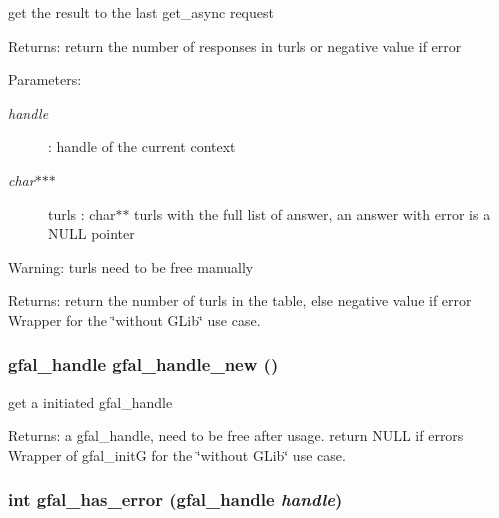get the result to the last get\_\-async request \begin{Desc}
\item[Returns:]return the number of responses in turls or negative value if error \end{Desc}
\begin{Desc}
\item[Parameters:]
\begin{description}
\item[{\em handle}]: handle of the current context \item[{\em char$\ast$$\ast$$\ast$}]turls : char$\ast$$\ast$ turls with the full list of answer, an answer with error is a NULL pointer \end{description}
\end{Desc}
\begin{Desc}
\item[Warning:]turls need to be free manually \end{Desc}
\begin{Desc}
\item[Returns:]return the number of turls in the table, else negative value if error Wrapper for the \char`\"{}without GLib\char`\"{} use case. \end{Desc}
\subsubsection{\setlength{\rightskip}{0pt plus 5cm}gfal\_\-handle gfal\_\-handle\_\-new ()}\label{gfal__common__interface_8c_4211faf02a3c5cc696c7c9f974415d11}


get a initiated gfal\_\-handle 

\begin{Desc}
\item[Returns:]a gfal\_\-handle, need to be free after usage. return NULL if errors Wrapper of gfal\_\-init\-G for the \char`\"{}without GLib\char`\"{} use case. \end{Desc}
\subsubsection{\setlength{\rightskip}{0pt plus 5cm}int gfal\_\-has\_\-error (gfal\_\-handle {\em handle})}\label{gfal__common__interface_8c_ad28f1c5d1a0ed623834e6133bb7dd2e}


